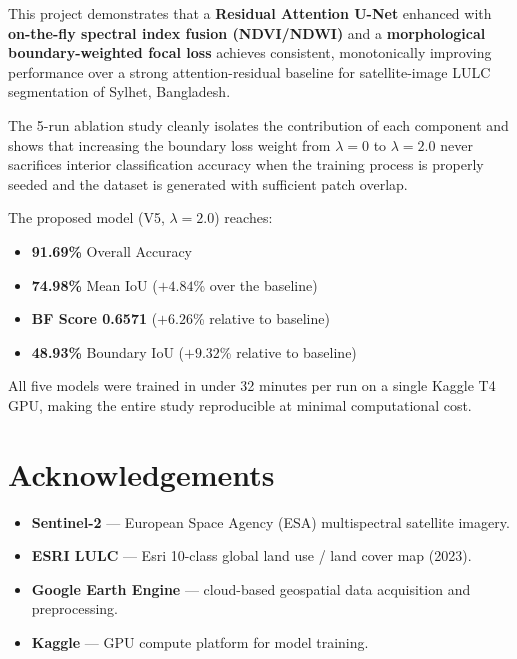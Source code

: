 \documentclass[12pt,a4paper]{article}
\begin{document}
This project demonstrates that a \textbf{Residual Attention U-Net} enhanced
with \textbf{on-the-fly spectral index fusion (NDVI/NDWI)} and a
\textbf{morphological boundary-weighted focal loss} achieves consistent,
monotonically improving performance over a strong attention-residual baseline
for satellite-image LULC segmentation of Sylhet, Bangladesh.

The 5-run ablation study cleanly isolates the contribution of each component
and shows that increasing the boundary loss weight from $\lambda = 0$ to
$\lambda = 2.0$ never sacrifices interior classification accuracy when the
training process is properly seeded and the dataset is generated with
sufficient patch overlap.

The proposed model (V5, $\lambda=2.0$) reaches:
\begin{itemize}
  \item \textbf{91.69\%} Overall Accuracy
  \item \textbf{74.98\%} Mean IoU ($+4.84$\% over the baseline)
  \item \textbf{BF Score 0.6571} ($+6.26$\% relative to baseline)
  \item \textbf{48.93\%} Boundary IoU ($+9.32$\% relative to baseline)
\end{itemize}

All five models were trained in under 32 minutes per run on a single Kaggle
T4 GPU, making the entire study reproducible at minimal computational cost.

\section*{Acknowledgements}
\begin{itemize}
  \item \textbf{Sentinel-2} — European Space Agency (ESA) multispectral satellite imagery.
  \item \textbf{ESRI LULC} — Esri 10-class global land use / land cover map (2023).
  \item \textbf{Google Earth Engine} — cloud-based geospatial data acquisition and preprocessing.
  \item \textbf{Kaggle} — GPU compute platform for model training.
\end{itemize}
\end{document}
